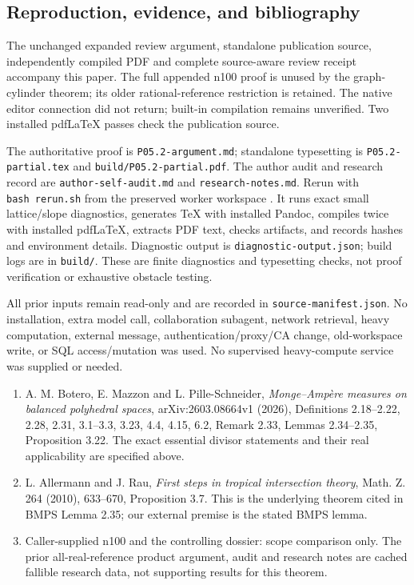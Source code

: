 \documentclass[
  11pt,
]{article}
\providecommand{\tightlist}{%
  \setlength{\itemsep}{0pt}\setlength{\parskip}{0pt}}
\begin{document}
\subsection{Reproduction, evidence, and
bibliography}\label{reproduction-evidence-and-bibliography}

The unchanged expanded review argument, standalone publication source,
independently compiled PDF and complete source-aware review receipt
accompany this paper. The full appended n100 proof is unused by the
graph-cylinder theorem; its older rational-reference restriction is
retained. The native editor connection did not return; built-in
compilation remains unverified. Two installed pdfLaTeX passes check
the publication source.

The authoritative proof is \texttt{P05.2-argument.md}; standalone
typesetting is \texttt{P05.2-partial.tex} and
\texttt{build/P05.2-partial.pdf}. The author audit and research record
are \texttt{author-self-audit.md} and \texttt{research-notes.md}. Rerun
with \texttt{bash\ rerun.sh} from the preserved worker workspace
.
It runs exact small
lattice/slope diagnostics, generates TeX with installed Pandoc, compiles
twice with installed pdfLaTeX, extracts PDF text, checks artifacts, and
records hashes and environment details. Diagnostic output is
\texttt{diagnostic-output.json}; build logs are in \texttt{build/}.
These are finite diagnostics and typesetting checks, not proof
verification or exhaustive obstacle testing.

All prior inputs remain read-only and are recorded in
\texttt{source-manifest.json}. No installation, extra model call,
collaboration subagent, network retrieval, heavy computation, external
message, authentication/proxy/CA change, old-workspace write, or SQL
access/mutation was used. No supervised heavy-compute service was
supplied or needed.

\begin{enumerate}
\def\labelenumi{\arabic{enumi}.}
\tightlist
\item
  A. M. Botero, E. Mazzon and L. Pille-Schneider, \emph{Monge--Ampère
  measures on balanced polyhedral spaces}, arXiv:2603.08664v1 (2026),
  Definitions 2.18--2.22, 2.28, 2.31, 3.1--3.3, 3.23, 4.4, 4.15, 6.2,
  Remark 2.33, Lemmas 2.34--2.35, Proposition 3.22. The exact essential
  divisor statements and their real applicability are specified above.
\item
  L. Allermann and J. Rau, \emph{First steps in tropical intersection
  theory}, Math. Z. 264 (2010), 633--670, Proposition 3.7. This is the
  underlying theorem cited in BMPS Lemma 2.35; our external premise is
  the stated BMPS lemma.
\item
  Caller-supplied n100 and the controlling dossier: scope comparison
  only. The prior all-real-reference product argument, audit and
  research notes are cached fallible research data, not supporting
  results for this theorem.
\end{enumerate}
\end{document}
